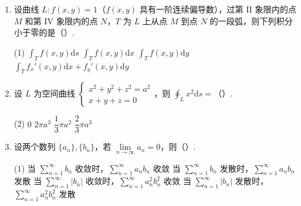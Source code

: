 \documentclass[../main.tex]{subfiles}
\begin{document}
\begin{enumerate}
    \item 设曲线 \( L: f(x, y) = 1 \)（\( f(x, y) \) 具有一阶连续偏导数），过第 II 象限内的点 \( M \) 和第 IV 象限内的点 \( N \)，\( T \) 为 \( L \) 上从点 \( M \) 到点 \( N \) 的一段弧，则下列积分小于零的是（\qquad）.

          \begin{tasks}[label=\textbf{\Alph*.}, label-width=1.5em, column-sep=1em](1)
              \task \( \displaystyle \int_T f(x, y) \mathrm{d}s \)
              \task \( \displaystyle \int_T f(x, y) \mathrm{d}x \)
              \task \( \displaystyle \int_T f(x, y) \mathrm{d}y \)
              \task \( \displaystyle \int_T f_x'(x, y) \mathrm{d}x + f_y'(x, y) \mathrm{d}y \)
          \end{tasks}

    \item 设 \( L \) 为空间曲线 \( \begin{cases} x^2 + y^2 + z^2 = a^2 \\ x + y + z = 0 \end{cases} \)，则 \( \displaystyle \oint_L x^2 \mathrm{d}s = \)（\qquad）.

          \begin{tasks}[label=\textbf{\Alph*.}, label-width=1.5em, column-sep=1em](2)
              \task \( 0 \)
              \task \( 2\pi a^3 \)
              \task \( \dfrac{1}{3}\pi a^2 \)
              \task \( \dfrac{2}{3}\pi a^3 \)
          \end{tasks}

    \item 设两个数列 \( \{a_n\}, \{b_n\} \)，若 \( \lim\limits_{n \to \infty} a_n = 0 \)，则（\qquad）.

          \begin{tasks}[label=\textbf{\Alph*.}, label-width=1.5em, column-sep=1em](1)
              \task 当 \( \sum \limits_{n=1}^{\infty} b_n \) 收敛时，\( \sum \limits_{n=1}^{\infty} a_n b_n \) 收敛
              \task 当 \( \sum \limits_{n=1}^{\infty} b_n \) 发散时，\( \sum \limits_{n=1}^{\infty} a_n b_n \) 发散
              \task 当 \( \sum \limits_{n=1}^{\infty} |b_n| \) 收敛时，\( \sum \limits_{n=1}^{\infty} a_n^2 b_n^2 \) 收敛
              \task 当 \( \sum \limits_{n=1}^{\infty} |b_n| \) 发散时，\( \sum \limits_{n=1}^{\infty} a_n^2 b_n^2 \) 发散
          \end{tasks}
\end{enumerate}
\end{document}
